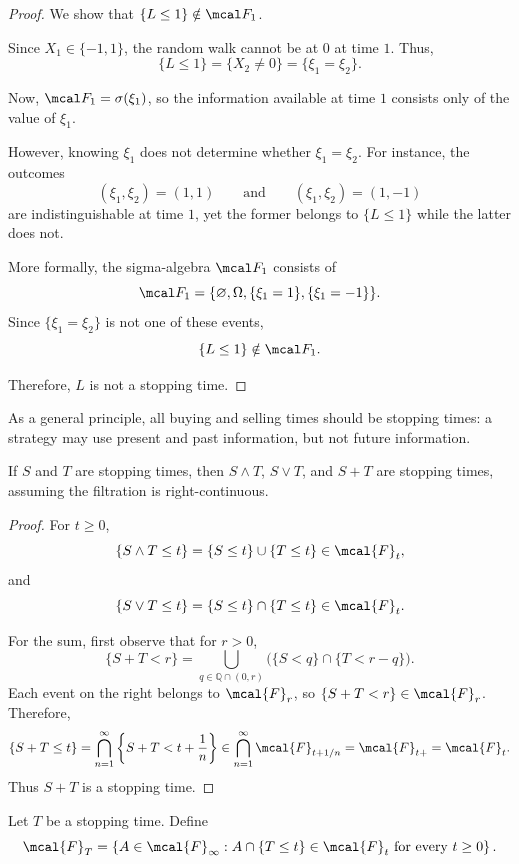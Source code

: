 \begin{proof}
We show that $\{L\leq 1\}\notin\mcal F_1$.

Since $X_1\in\{-1,1\}$, the random walk cannot be at $0$
at time $1$. Thus,
\[
    \{L\leq 1\}
    =\{X_2\neq 0\}
    =\{\xi_1=\xi_2\}.
\]

Now, $\mcal F_1=\sigma(\xi_1)$, so the information
available at time $1$ consists only of the value of $\xi_1$.

However, knowing $\xi_1$ does not determine whether
$\xi_1=\xi_2$. For instance, the outcomes
\[
    (\xi_1,\xi_2)=(1,1)
    \qquad\text{and}\qquad
    (\xi_1,\xi_2)=(1,-1)
\]
are indistinguishable at time $1$, yet the former belongs
to $\{L\leq 1\}$ while the latter does not.

More formally, the sigma-algebra $\mcal F_1$ consists of
\[
    \mcal F_1
    =\{\varnothing,\Omega,\{\xi_1=1\},\{\xi_1=-1\}\}.
\]
Since $\{\xi_1=\xi_2\}$ is not one of these events,
\[
    \{L\leq 1\}\notin\mcal F_1.
\]

Therefore, $L$ is not a stopping time.
\end{proof}

As a general principle, all buying and selling times should be stopping
times: a strategy may use present and past information, but not future
information.

\begin{proposition}
If $S$ and $T$ are stopping times, then $S\wedge T$, $S\vee T$, and
$S+T$ are stopping times, assuming the filtration is right-continuous.
\end{proposition}

\begin{proof}
For $t\geq 0$,
\[
    \{S\wedge T\leq t\}
    =
    \{S\leq t\}\cup\{T\leq t\}\in\mcal{F}_t,
\]
and
\[
    \{S\vee T\leq t\}
    =
    \{S\leq t\}\cap\{T\leq t\}\in\mcal{F}_t.
\]

For the sum, first observe that for $r>0$,
\[
    \{S+T<r\}
    =
    \bigcup_{q\in\mathbb{Q}\cap(0,r)}
    \bigl(\{S<q\}\cap\{T<r-q\}\bigr).
\]
Each event on the right belongs to $\mcal{F}_r$, so
$\{S+T<r\}\in\mcal{F}_r$. Therefore,
\[
    \{S+T\leq t\}
    =
    \bigcap_{n=1}^\infty
    \left\{S+T<t+\frac{1}{n}\right\}
    \in
    \bigcap_{n=1}^\infty\mcal{F}_{t+1/n}
    =
    \mcal{F}_{t+}
    =
    \mcal{F}_t.
\]
Thus $S+T$ is a stopping time.
\end{proof}

\begin{definition}
Let $T$ be a stopping time. Define
\[
    \mcal{F}_T
    =
    \left\{
        A\in\mcal{F}_\infty:
        A\cap\{T\leq t\}\in\mcal{F}_t
        \text{ for every }t\geq 0
    \right\}.
\]
\end{definition}

